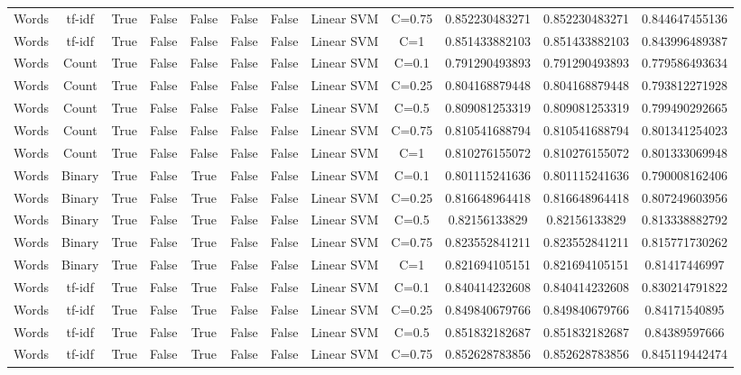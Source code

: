 \documentclass[11pt]{article}
\begin{document}
\begin{tabular}{|c|c|c|c|c|c|c|c|c|c|c|c|}
Words & tf-idf & True & False & False & False & False & Linear SVM & C=0.75 & 0.852230483271 & 0.852230483271 & 0.844647455136 \\ 
Words & tf-idf & True & False & False & False & False & Linear SVM & C=1 & 0.851433882103 & 0.851433882103 & 0.843996489387 \\ 
Words & Count & True & False & False & False & False & Linear SVM & C=0.1 & 0.791290493893 & 0.791290493893 & 0.779586493634 \\ 
Words & Count & True & False & False & False & False & Linear SVM & C=0.25 & 0.804168879448 & 0.804168879448 & 0.793812271928 \\ 
Words & Count & True & False & False & False & False & Linear SVM & C=0.5 & 0.809081253319 & 0.809081253319 & 0.799490292665 \\ 
Words & Count & True & False & False & False & False & Linear SVM & C=0.75 & 0.810541688794 & 0.810541688794 & 0.801341254023 \\ 
Words & Count & True & False & False & False & False & Linear SVM & C=1 & 0.810276155072 & 0.810276155072 & 0.801333069948 \\ 
Words & Binary & True & False & True & False & False & Linear SVM & C=0.1 & 0.801115241636 & 0.801115241636 & 0.790008162406 \\ 
Words & Binary & True & False & True & False & False & Linear SVM & C=0.25 & 0.816648964418 & 0.816648964418 & 0.807249603956 \\ 
Words & Binary & True & False & True & False & False & Linear SVM & C=0.5 & 0.82156133829 & 0.82156133829 & 0.813338882792 \\ 
Words & Binary & True & False & True & False & False & Linear SVM & C=0.75 & 0.823552841211 & 0.823552841211 & 0.815771730262 \\ 
Words & Binary & True & False & True & False & False & Linear SVM & C=1 & 0.821694105151 & 0.821694105151 & 0.81417446997 \\ 
Words & tf-idf & True & False & True & False & False & Linear SVM & C=0.1 & 0.840414232608 & 0.840414232608 & 0.830214791822 \\ 
Words & tf-idf & True & False & True & False & False & Linear SVM & C=0.25 & 0.849840679766 & 0.849840679766 & 0.84171540895 \\ 
Words & tf-idf & True & False & True & False & False & Linear SVM & C=0.5 & 0.851832182687 & 0.851832182687 & 0.84389597666 \\ 
Words & tf-idf & True & False & True & False & False & Linear SVM & C=0.75 & 0.852628783856 & 0.852628783856 & 0.845119442474 \\ 

\end{tabular}
\end{document}
